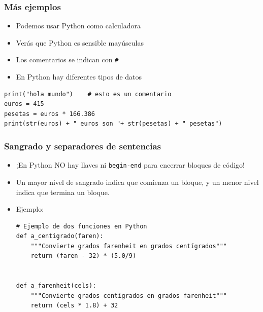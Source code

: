 \documentclass{beamer}
\begin{document}
\begin{frame}[fragile]

\frametitle{Más ejemplos}

\begin{itemize}
\item Podemos usar Python como calculadora

\item Verás que Python es sensible mayúsculas

\item Los comentarios se indican con \verb=#=

\item En Python hay diferentes tipos de datos

\end{itemize}

\begin{footnotesize}
\begin{verbatim}
print("hola mundo")    # esto es un comentario
euros = 415
pesetas = euros * 166.386
print(str(euros) + " euros son "+ str(pesetas) + " pesetas")
\end{verbatim}
\end{footnotesize}

\end{frame}



\begin{frame}[fragile]
\frametitle{Sangrado y separadores de sentencias}

\begin{itemize}
\item ¡En Python NO hay llaves ni \verb|begin-end| para encerrar bloques
  de código!
\item Un mayor nivel de sangrado indica que comienza un bloque,
  y un menor nivel indica que termina un bloque.
  
\item Ejemplo:

  \begin{footnotesize}
\begin{verbatim}
# Ejemplo de dos funciones en Python
def a_centigrado(faren):
    """Convierte grados farenheit en grados centígrados"""
    return (faren - 32) * (5.0/9)


def a_farenheit(cels):
    """Convierte grados centígrados en grados farenheit"""
    return (cels * 1.8) + 32
\end{verbatim}
  \end{footnotesize}
\end{itemize}
\end{frame}
\end{document}
